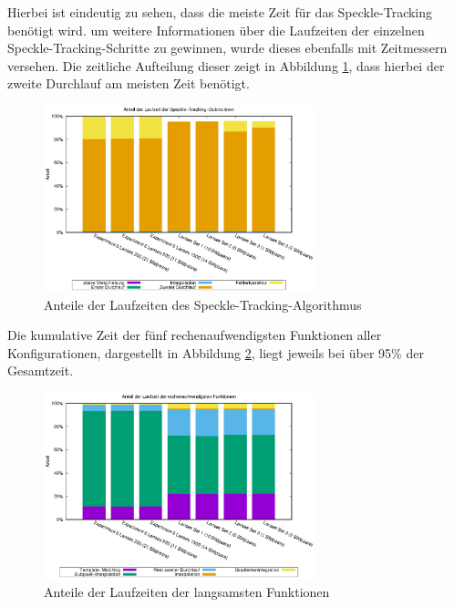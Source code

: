 Hierbei ist eindeutig zu sehen, dass die meiste Zeit für das Speckle-Tracking benötigt wird. um weitere Informationen über die Laufzeiten der einzelnen Speckle-Tracking-Schritte zu gewinnen, wurde dieses ebenfalls mit Zeitmessern versehen. Die zeitliche Aufteilung dieser zeigt in Abbildung \ref{fig:perc_speckle}, dass hierbei der zweite Durchlauf am meisten Zeit benötigt. 

\begin{center}
	\begin{figure}[htbp]
		\centering
		\includegraphics[width=0.7\textwidth]{pdf/speckle}
		\caption{Anteile der Laufzeiten des Speckle-Tracking-Algorithmus}
		\label{fig:perc_speckle}
	\end{figure}
\end{center}

Die kumulative Zeit der fünf rechenaufwendigsten Funktionen aller Konfigurationen, dargestellt in Abbildung \ref{fig:perc_slow}, liegt jeweils bei über 95\% der Gesamtzeit. 

\begin{center}
	\begin{figure}[htbp]
		\centering
		\includegraphics[width=0.7\textwidth]{pdf/slow}
		\caption{Anteile der Laufzeiten der langsamsten Funktionen}
		\label{fig:perc_slow}
	\end{figure}
\end{center}

